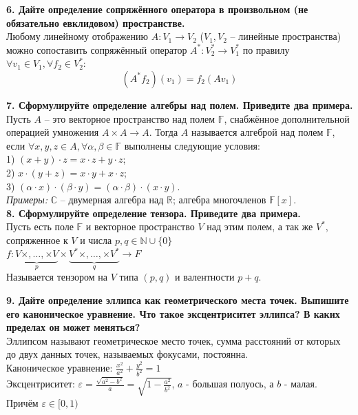\documentclass[11pt,a4paper]{article}
\renewcommand{\C}{\mathbb{C}}
\newcommand{\R}{\mathbb{R}}
\newcommand{\F}{\mathbb{F}}
\begin{document}
\textbf{6. Дайте определение сопряжённого оператора в произвольном (не обязательно евклидовом) пространстве.\\}
Любому линейному отображению $A : V_1 \rightarrow V_2$ ($V_1, V_2$ -- линейные пространства) можно сопоставить сопряжённый оператор $A^* : V_2^*\rightarrow V_1^*$ по правилу $\forall v_1 \in V_1, \forall f_2 \in V_2^*$: $$(A^* f_2)(v_1) = f_2 (A v_1)$$

\textbf{7. Сформулируйте определение алгебры над полем. Приведите два примера.\\}
Пусть $A$ -- это векторное пространство над полем $\F$, снабжённое дополнительной операцией умножения $A \times A \rightarrow A$. Тогда $A$ называется алгеброй над полем $\F$, если $\forall x, y, z \in A, \forall \alpha, \beta \in \F$ выполнены следующие условия:\\
1) $(x + y) \cdot z = x \cdot z + y \cdot z$;\\
2) $x \cdot (y + z) = x \cdot y + x \cdot z$;\\
3) $(\alpha \cdot x) \cdot (\beta \cdot y) = (\alpha \cdot \beta) \cdot (x \cdot y)$.\\
\textit{Примеры:} $\C$ -- двумерная алгебра над $\R$; алгебра многочленов $\F [x]$.\\

\textbf{8. Сформулируйте определение тензора. Приведите два примера.\\}
Пусть есть поле $\F$ и векторное пространство $V$ над этим полем, а так же $V^*$, сопряженное к $V$ и числа $p, q \in \mathbb{N} \cup \{0\}$
\\
$f: \underbrace{V \times, \dots, \times V}_{p} \times \underbrace{V^* \times, \dots, \times V^*}_{q} \to F$
\\
Называется тензором на $V$ типа $(p, q)$ и валентности $p + q$.

\textbf{9. Дайте определение эллипса как геометрического места точек. Выпишите его каноническое уравнение. Что такое эксцентриситет эллипса? В каких пределах он может меняться?\\}
Эллипсом называют геометрическое место точек, сумма расстояний от которых до двух данных точек, называемых фокусами, постоянна.
\\
Каноническое уравнение: $\frac{x^2}{a^2} + \frac{y^2}{b^2} = 1$
\\
Эксцентриситет: $\varepsilon = \frac{\sqrt{a^2 - b^2}}{a} = \sqrt{1 - \frac{a^2}{b^2}}$, $a$ - большая полуось, а $b$ - малая.
\\
Причём $\varepsilon \in [0, 1)$
\end{document}

